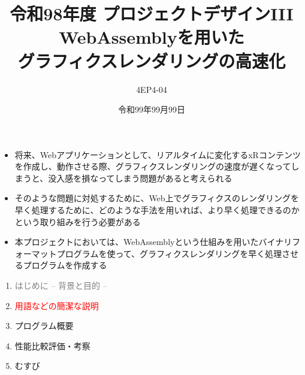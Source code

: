 % 
%

\title{
{\normalsize 令和98年度 プロジェクトデザインIII}\\\vspace{10mm}
{\LARGE WebAssemblyを用いた\\グラフィクスレンダリングの高速化}
}
\date{令和99年99月99日}
\author{
4EP4-04\\ 
}




\maketitle %
\addtocounter{page}{1}
\thispagestyle{myfirstpage}

\begin{itemize}
 \item 将来、Webアプリケーションとして、リアルタイムに変化するxRコンテンツを作成し、動作させる際、グラフィクスレンダリングの速度が遅くなってしまうと、没入感を損なってしまう問題があると考えられる
 \item そのような問題に対処するために、Web上でグラフィクスのレンダリングを早く処理するために、どのような手法を用いれば、より早く処理できるのかという取り組みを行う必要がある
 \item 本プロジェクトにおいては、WebAssemblyという仕組みを用いたバイナリフォーマットプログラムを使って、グラフィクスレンダリングを早く処理させるプログラムを作成する
\end{itemize}
\newpage

\begin{enumerate}[itemsep=0.25\zh]
	\item \textcolor{gray}{はじめに -- 背景と目的 --}
	\item \textcolor{red}{用語などの簡潔な説明}
	\item プログラム概要
	\item 性能比較評価・考察
	\item むすび
\end{enumerate}
\newpage

